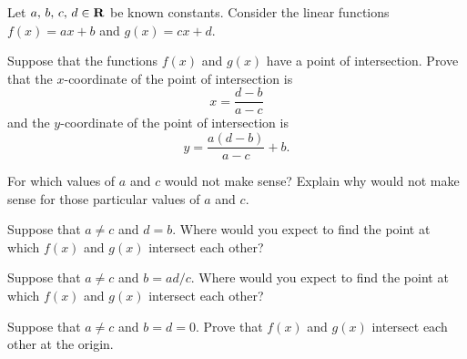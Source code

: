 \documentclass[a4paper,oneside,12pt]{article}
\begin{document}
\begin{problem}
\item\label{prob:linear_functions_intersection_point}
  Let ${a},\, {b},\, {c},\, {d} \in \mathbf{R}$ be known constants.
  Consider the linear functions $f(x) = ax + b$ and $g(x) = cx + d$.
  \begin{packedenum}
  \item\label{subprob:intersection_point_x_y_coordinates}
    Suppose that the functions $f(x)$ and $g(x)$ have a point of
    intersection.  Prove that the $x$-coordinate of the point of
    intersection is
    \begin{equation}
    \label{eqn:intersection_point_x_coordinate}
    x
    =
    \frac{d - b}{a - c}
    \end{equation}
    and the $y$-coordinate of the point of intersection is
    \[
    y
    =
    \frac{a(d - b)}{a - c}
    +
    b.
    \]

  \item\label{subprob:intersection_point_undefined}
    For which values of $a$ and $c$ would
     not make sense?
    Explain why  would
    not make sense for those particular values of $a$ and $c$.

  \item\label{subprob:intersection_point_on_y_axis}
    Suppose that $a \neq c$ and $d = b$.  Where would you expect to
    find the point at which $f(x)$ and $g(x)$ intersect each other?

  \item\label{subprob:intersection_point_on_x_axis}
    Suppose that $a \neq c$ and $b = ad / c$.  Where would you expect
    to find the point at which $f(x)$ and $g(x)$ intersect each other?

  \item\label{subprob:intersection_point_origin}
    Suppose that $a \neq c$ and $b = d = 0$.  Prove that $f(x)$ and
    $g(x)$ intersect each other at the origin.
  \end{packedenum}
\end{problem}
\end{document}
